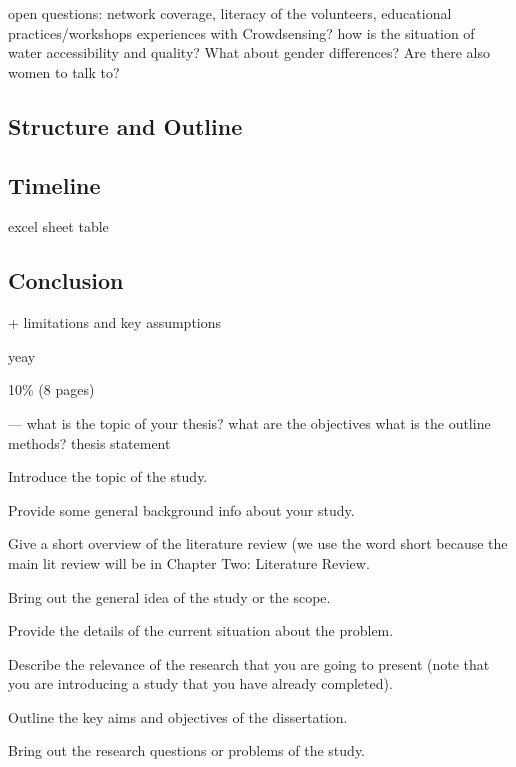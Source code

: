 open questions: network coverage, literacy of the volunteers, educational practices/workshops
experiences with Crowdsensing?
how is the situation of water accessibility and quality?
What about gender differences?
Are there also women to talk to?



\subsection{Structure and Outline}


\subsection{Timeline}
excel sheet table


\subsection{Conclusion}

+ limitations and key assumptions

yeay

10\% (8 pages)

---
what is the topic of your thesis?
what are the objectives
what is the outline
methods?
thesis statement

Introduce the topic of the study.

Provide some general background info about your study.

Give a short overview of the literature review (we use the word short because the main lit review will be in Chapter Two: Literature Review.

Bring out the general idea of the study or the scope.

Provide the details of the current situation about the problem.

Describe the relevance of the research that you are going to present (note that you are introducing a study that you have already completed).

Outline the key aims and objectives of the dissertation.

Bring out the research questions or problems of the study.


